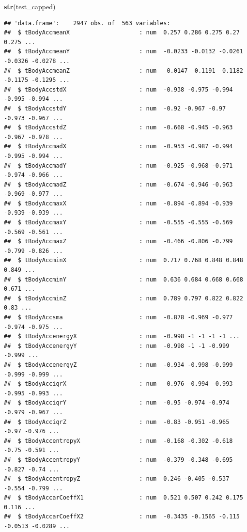 \documentclass[
]{article}
\newenvironment{Shaded}{\begin{snugshade}}{\end{snugshade}}
\newcommand{\FunctionTok}[1]{\textcolor[rgb]{0.13,0.29,0.53}{\textbf{#1}}}
\newcommand{\NormalTok}[1]{#1}
\begin{document}
\begin{Shaded}
\begin{Highlighting}[]
\FunctionTok{str}\NormalTok{(test\_capped)}
\end{Highlighting}
\end{Shaded}

\begin{verbatim}
## 'data.frame':    2947 obs. of  563 variables:
##  $ tBodyAccmeanX                    : num  0.257 0.286 0.275 0.27 0.275 ...
##  $ tBodyAccmeanY                    : num  -0.0233 -0.0132 -0.0261 -0.0326 -0.0278 ...
##  $ tBodyAccmeanZ                    : num  -0.0147 -0.1191 -0.1182 -0.1175 -0.1295 ...
##  $ tBodyAccstdX                     : num  -0.938 -0.975 -0.994 -0.995 -0.994 ...
##  $ tBodyAccstdY                     : num  -0.92 -0.967 -0.97 -0.973 -0.967 ...
##  $ tBodyAccstdZ                     : num  -0.668 -0.945 -0.963 -0.967 -0.978 ...
##  $ tBodyAccmadX                     : num  -0.953 -0.987 -0.994 -0.995 -0.994 ...
##  $ tBodyAccmadY                     : num  -0.925 -0.968 -0.971 -0.974 -0.966 ...
##  $ tBodyAccmadZ                     : num  -0.674 -0.946 -0.963 -0.969 -0.977 ...
##  $ tBodyAccmaxX                     : num  -0.894 -0.894 -0.939 -0.939 -0.939 ...
##  $ tBodyAccmaxY                     : num  -0.555 -0.555 -0.569 -0.569 -0.561 ...
##  $ tBodyAccmaxZ                     : num  -0.466 -0.806 -0.799 -0.799 -0.826 ...
##  $ tBodyAccminX                     : num  0.717 0.768 0.848 0.848 0.849 ...
##  $ tBodyAccminY                     : num  0.636 0.684 0.668 0.668 0.671 ...
##  $ tBodyAccminZ                     : num  0.789 0.797 0.822 0.822 0.83 ...
##  $ tBodyAccsma                      : num  -0.878 -0.969 -0.977 -0.974 -0.975 ...
##  $ tBodyAccenergyX                  : num  -0.998 -1 -1 -1 -1 ...
##  $ tBodyAccenergyY                  : num  -0.998 -1 -1 -0.999 -0.999 ...
##  $ tBodyAccenergyZ                  : num  -0.934 -0.998 -0.999 -0.999 -0.999 ...
##  $ tBodyAcciqrX                     : num  -0.976 -0.994 -0.993 -0.995 -0.993 ...
##  $ tBodyAcciqrY                     : num  -0.95 -0.974 -0.974 -0.979 -0.967 ...
##  $ tBodyAcciqrZ                     : num  -0.83 -0.951 -0.965 -0.97 -0.976 ...
##  $ tBodyAccentropyX                 : num  -0.168 -0.302 -0.618 -0.75 -0.591 ...
##  $ tBodyAccentropyY                 : num  -0.379 -0.348 -0.695 -0.827 -0.74 ...
##  $ tBodyAccentropyZ                 : num  0.246 -0.405 -0.537 -0.554 -0.799 ...
##  $ tBodyAccarCoeffX1                : num  0.521 0.507 0.242 0.175 0.116 ...
##  $ tBodyAccarCoeffX2                : num  -0.3435 -0.1565 -0.115 -0.0513 -0.0289 ...

\end{verbatim}
\end{document}
